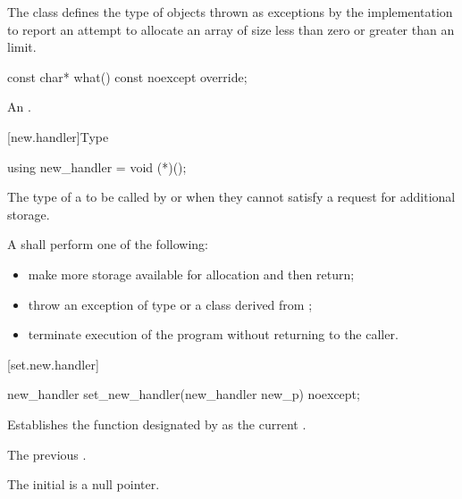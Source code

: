 \pnum
The class  defines the type of objects thrown as
exceptions by the implementation to report an attempt to allocate an array of size
less than zero or
greater than an  limit.

%
\begin{itemdecl}
const char* what() const noexcept override;
\end{itemdecl}

\begin{itemdescr}
\pnum
\returns
An  \ntbs{}.
\end{itemdescr}

[new.handler]{Type }

%
\begin{itemdecl}
using new_handler = void (*)();
\end{itemdecl}

\begin{itemdescr}
\pnum
The type of a
to be called by
or
 when they cannot satisfy a request for additional storage.

\pnum
\required
A  shall perform one of the following:
\begin{itemize}
\item
make more storage available for allocation and then return;
\item
throw an exception of type
or a class derived from
%
;
\item
terminate execution of the program without returning to the caller.
%
%
\end{itemize}
\end{itemdescr}

[set.new.handler]{}

%
\begin{itemdecl}
new_handler set_new_handler(new_handler new_p) noexcept;
\end{itemdecl}

\begin{itemdescr}
\pnum
\effects
Establishes the function designated by  as the current
.

\pnum
\returns
The previous .

\pnum
\remarks
The initial  is a null pointer.
\end{itemdescr}

